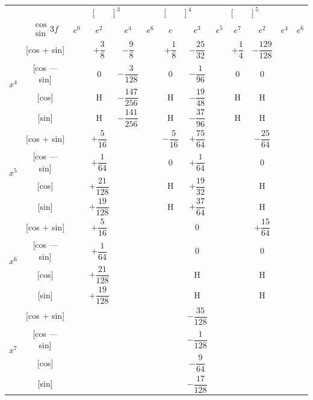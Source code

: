 \documentclass[11pt,a4paper]{book}
\begin{document}
{{\vspace{1em}


\begin{center}
\small
\begin{tabular}{|c|c|c|c|c|c|c|c|c|c|c|c|}
\hline
& &  &  &  \\
& $\begin{smallmatrix} \cos \\ \sin \end{smallmatrix} 3f$ & $e^0$ & $e^2$ & $e^4$ & $e^6$ & $e$ & $e^3$ & $e^5$ & $e^7$ & $e^2$ & $e^4$ & $e^6$ \\
\hline
{} & [cos + sin] & & $+\dfrac{3}{8}$ & $-\dfrac{9}{8}$ & & $+\dfrac{1}{8}$ & $-\dfrac{25}{32}$ & & $+\dfrac{1}{4}$ & $-\dfrac{129}{128}$ \\
& [cos --- sin] & & $0$ & $-\dfrac{3}{128}$ & & $0$ & $-\dfrac{1}{96}$ & & $0$ & $0$ \\
& [cos] & & H & $-\dfrac{147}{256}$ & & H & $-\dfrac{19}{48}$ & & H & H \\
& [sin] & & H & $-\dfrac{141}{256}$ & & H & $-\dfrac{37}{96}$ & & H & H \\
\hline
{} & [cos + sin] & & $+\dfrac{5}{16}$ & & & $-\dfrac{5}{16}$ & $+\dfrac{75}{64}$ & & & $-\dfrac{25}{64}$ \\
& [cos --- sin] & & $+\dfrac{1}{64}$ & & & $0$ & $+\dfrac{1}{64}$ & & & $0$ \\
& [cos] & & $+\dfrac{21}{128}$ & & & H & $+\dfrac{19}{32}$ & & & H \\
& [sin] & & $+\dfrac{19}{128}$ & & & H & $+\dfrac{37}{64}$ & & & H \\
\hline
{} & [cos + sin] & & $+\dfrac{5}{16}$ & & & & $0$ & & & $+\dfrac{15}{64}$ \\
& [cos --- sin] & & $+\dfrac{1}{64}$ & & & & $0$ & & & $0$ \\
& [cos] & & $+\dfrac{21}{128}$ & & & & H & & & H \\
& [sin] & & $+\dfrac{19}{128}$ & & & & H & & & H \\
\hline
{} & [cos + sin] & & & & & & $-\dfrac{35}{128}$ & & \\
& [cos --- sin] & & & & & & $-\dfrac{1}{128}$ & & \\
& [cos] & & & & & & $-\dfrac{9}{64}$ & & \\
& [sin] & & & & & & $-\dfrac{17}{128}$ & & \\
\hline
\end{tabular}
\end{center}

}}
\end{document}
